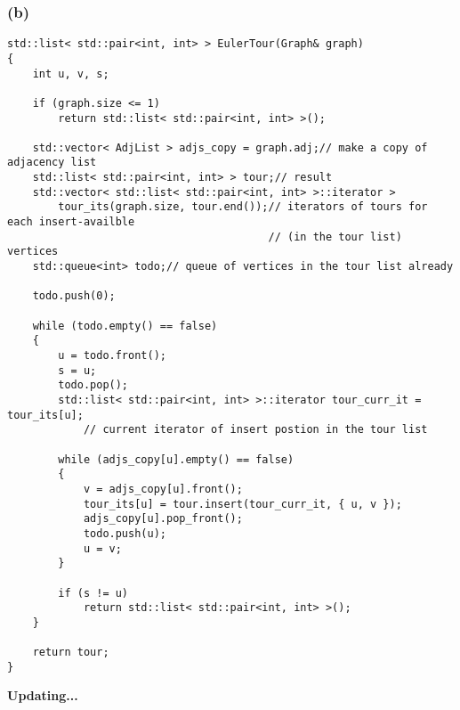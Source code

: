 \subsubsection*{(b)}

\begin{verbatim}
std::list< std::pair<int, int> > EulerTour(Graph& graph)
{
    int u, v, s;

    if (graph.size <= 1)
        return std::list< std::pair<int, int> >();

    std::vector< AdjList > adjs_copy = graph.adj;// make a copy of adjacency list
    std::list< std::pair<int, int> > tour;// result
    std::vector< std::list< std::pair<int, int> >::iterator > 
        tour_its(graph.size, tour.end());// iterators of tours for each insert-availble 
                                         // (in the tour list) vertices
    std::queue<int> todo;// queue of vertices in the tour list already
    
    todo.push(0);

    while (todo.empty() == false)
    {
        u = todo.front();
        s = u;
        todo.pop();
        std::list< std::pair<int, int> >::iterator tour_curr_it = tour_its[u];
            // current iterator of insert postion in the tour list

        while (adjs_copy[u].empty() == false)
        {
            v = adjs_copy[u].front();
            tour_its[u] = tour.insert(tour_curr_it, { u, v });
            adjs_copy[u].pop_front();
            todo.push(u);
            u = v;
        }

        if (s != u)
            return std::list< std::pair<int, int> >();
    }

    return tour;
}
\end{verbatim}

\centerline{\textbf{Updating...}}

